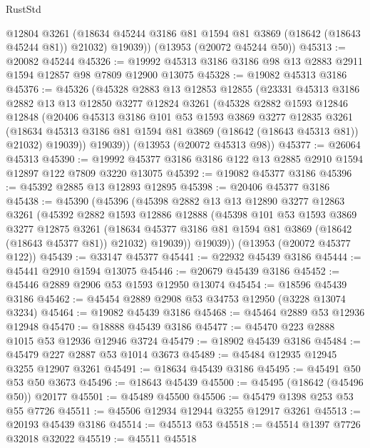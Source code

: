 \begin{lexlean}{RustStd}
\begin{coremodule}
        @12804
        @3261
        (@18634 @45244 @3186 @81 @1594 @81 @3869 (@18642 (@18643 @45244 @81)) @21032)
        @19039))
    (@13953 (@20072 @45244 @50))
@45313 := @20082 @45244
@45326 := @19992 @45313 @3186 @3186 @98 @13 @2883 @2911 @1594 @12857 @98 @7809 @12900 @13075
@45328 := @19082 @45313 @3186
@45376 := @45326
    (@45328
      @2883
      @13
      @12853
      @12855
      (@23331
        @45313
        @3186
        @2882
        @13
        @13
        @12850
        @3277
        @12824
        @3261
        (@45328
          @2882
          @1593
          @12846
          @12848
          (@20406
            @45313
            @3186
            @101
            @53
            @1593
            @3869
            @3277
            @12835
            @3261
            (@18634 @45313 @3186 @81 @1594 @81 @3869 (@18642 (@18643 @45313 @81)) @21032)
            @19039))
        @19039))
    (@13953 (@20072 @45313 @98))
@45377 := @26064 @45313
@45390 := @19992 @45377 @3186 @3186 @122 @13 @2885 @2910 @1594 @12897 @122 @7809 @3220 @13075
@45392 := @19082 @45377 @3186
@45396 := @45392 @2885 @13 @12893 @12895
@45398 := @20406 @45377 @3186
@45438 := @45390
    (@45396
      (@45398
        @2882
        @13
        @13
        @12890
        @3277
        @12863
        @3261
        (@45392
          @2882
          @1593
          @12886
          @12888
          (@45398
            @101
            @53
            @1593
            @3869
            @3277
            @12875
            @3261
            (@18634 @45377 @3186 @81 @1594 @81 @3869 (@18642 (@18643 @45377 @81)) @21032)
            @19039))
        @19039))
    (@13953 (@20072 @45377 @122))
@45439 := @33147 @45377
@45441 := @22932 @45439 @3186
@45444 := @45441 @2910 @1594 @13075
@45446 := @20679 @45439 @3186
@45452 := @45446 @2889 @2906 @53 @1593 @12950 @13074
@45454 := @18596 @45439 @3186
@45462 := @45454 @2889 @2908 @53 @34753 @12950 (@3228 @13074 @3234)
@45464 := @19082 @45439 @3186
@45468 := @45464 @2889 @53 @12936 @12948
@45470 := @18888 @45439 @3186
@45477 := @45470 @223 @2888 @1015 @53 @12936 @12946 @3724
@45479 := @18902 @45439 @3186
@45484 := @45479 @227 @2887 @53 @1014 @3673
@45489 := @45484 @12935 @12945 @3255 @12907 @3261
@45491 := @18634 @45439 @3186
@45495 := @45491 @50 @53 @50 @3673
@45496 := @18643 @45439
@45500 := @45495 (@18642 (@45496 @50)) @20177
@45501 := @45489 @45500
@45506 := @45479 @1398 @253 @53 @55 @7726
@45511 := @45506 @12934 @12944 @3255 @12917 @3261
@45513 := @20193 @45439 @3186
@45514 := @45513 @53
@45518 := @45514 @1397 @7726 @32018 @32022
@45519 := @45511 @45518

\end{coremodule}
\end{lexlean}
